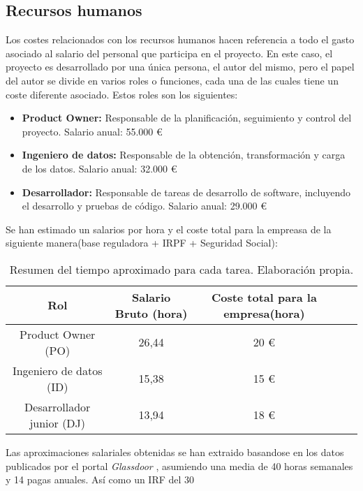 \subsection{Recursos humanos}

Los costes relacionados con los recursos humanos hacen referencia a todo el gasto asociado al salario del personal que participa en el proyecto. 
En este caso, el proyecto es desarrollado por una única persona, el autor del mismo, pero el papel del autor se divide en varios roles o funciones, 
cada una de las cuales tiene un coste diferente asociado. Estos roles son los siguientes:
\begin{itemize}
    \item  \textbf{Product Owner:} Responsable de la planificación, seguimiento y control del proyecto. Salario anual: 55.000 €
    \item  \textbf{Ingeniero de datos:} Responsable de la obtención, transformación y carga de los datos. Salario anual: 32.000 €
    \item  \textbf{Desarrollador:} Responsable de tareas de desarrollo de software, incluyendo el desarrollo y pruebas de código. Salario anual: 29.000 €
\end{itemize}

Se han estimado un salarios por hora y el coste total para la empreasa de la siguiente manera(base reguladora + IRPF + Seguridad Social):

\begin{table}[H]
    \centering
    \begin{tabular}{|c|c|c|c|c|}
        \hline
        \textbf{Rol} & \textbf{Salario Bruto (hora)} & \textbf{Coste total para la empresa(hora)}\\
        \hline
        Product Owner (PO) & 26,44 & 20  € \\
        Ingeniero de datos (ID) & 15,38 & 15 € \\
        Desarrollador junior (DJ) & 13,94 & 18  € \\
        \hline
    \end{tabular}
    \caption{Resumen del tiempo aproximado para cada tarea. Elaboración propia.}
    \label{tab:estimaciones}
\end{table}

Las aproximaciones salariales obtenidas se han extraido basandose en los datos publicados por el portal \textit{Glassdoor} \cite{glassdoor}, 
asumiendo una media de 40 horas semanales y 14 pagas anuales. Así como un IRF del 30

